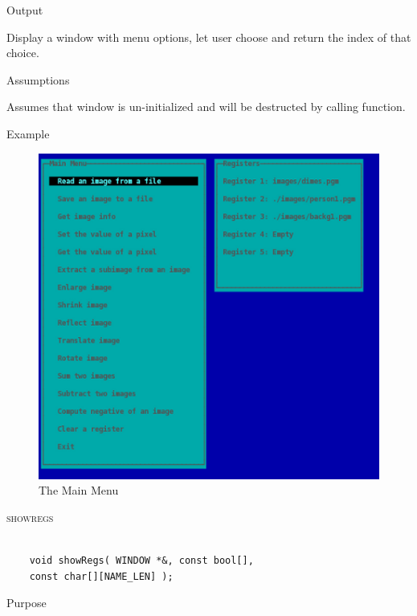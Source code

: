 \documentclass[pdftex, 11pt]{article}
\begin{document}
\begin{description}
\begin{description}
\begin{itemize}
				\end{itemize}

			\item{Output}
				
				Display a window with menu options, let user choose and
				return the index of that choice.

			\item{Assumptions}

				Assumes that window is un-initialized and will be destructed
				by calling function.

			\item{Example}

				\begin{figure}[ht!]
					\centering
					\caption{The Main Menu}
					\includegraphics{images/menu.png}
				\end{figure}

		\end{description}


	\item{\textsc{showregs}}

		\begin{lstlisting}

	void showRegs( WINDOW *&, const bool[], 
	const char[][NAME_LEN] );	
		\end{lstlisting}

		\begin{description}
			\item{Purpose}


\end{description}
\end{description}
\end{document}
